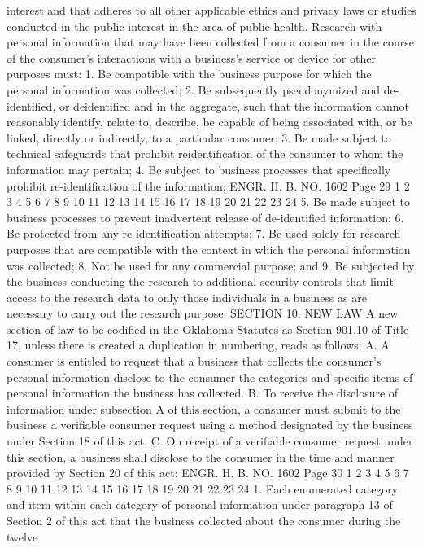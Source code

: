 interest and that adheres to all other applicable ethics and privacy
laws or studies conducted in the public interest in the area of
public health. Research with personal information that may have
been collected from a consumer in the course of the consumer's
interactions with a business's service or device for other purposes
must:
1. Be compatible with the business purpose for which the
personal information was collected;
2. Be subsequently pseudonymized and de-identified, or deidentified and in the aggregate, such that the information cannot
reasonably identify, relate to, describe, be capable of being
associated with, or be linked, directly or indirectly, to a
particular consumer;
3. Be made subject to technical safeguards that prohibit reidentification of the consumer to whom the information may pertain;
4. Be subject to business processes that specifically prohibit
re-identification of the information;
ENGR. H. B. NO. 1602 Page 29
1
2
3
4
5
6
7
8
9
10
11
12
13
14
15
16
17
18
19
20
21
22
23
24
5. Be made subject to business processes to prevent inadvertent
release of de-identified information;
6. Be protected from any re-identification attempts;
7. Be used solely for research purposes that are compatible
with the context in which the personal information was collected;
8. Not be used for any commercial purpose; and
9. Be subjected by the business conducting the research to
additional security controls that limit access to the research data
to only those individuals in a business as are necessary to carry
out the research purpose.
SECTION 10. NEW LAW A new section of law to be codified
in the Oklahoma Statutes as Section 901.10 of Title 17, unless there
is created a duplication in numbering, reads as follows:
A. A consumer is entitled to request that a business that
collects the consumer's personal information disclose to the
consumer the categories and specific items of personal information
the business has collected.
B. To receive the disclosure of information under subsection A
of this section, a consumer must submit to the business a verifiable
consumer request using a method designated by the business under
Section 18 of this act.
C. On receipt of a verifiable consumer request under this
section, a business shall disclose to the consumer in the time and
manner provided by Section 20 of this act:
ENGR. H. B. NO. 1602 Page 30
1
2
3
4
5
6
7
8
9
10
11
12
13
14
15
16
17
18
19
20
21
22
23
24
1. Each enumerated category and item within each category of
personal information under paragraph 13 of Section 2 of this act
that the business collected about the consumer during the twelve
